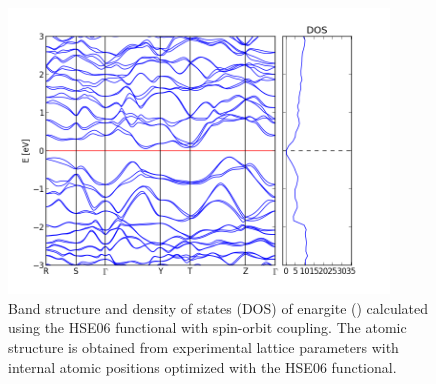 \begin{figure}[h!]
  \centering
    \includegraphics[width=0.9\textwidth]{figures/stephanite_band_structure.png}
    \caption{Band structure and density of states (DOS) of enargite ({\stephanite}) calculated using the HSE06 functional with spin-orbit coupling. The atomic structure is obtained from experimental lattice parameters with internal atomic positions optimized with the HSE06 functional.}
  \label{stephanite_band_structure}
\end{figure}

